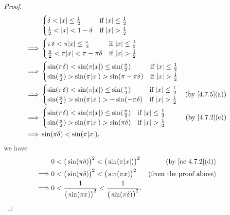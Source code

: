 \begin{proof}
\begin{align*}
             & \begin{cases}
                 \delta < \abs{x} \leq \frac{1}{2}  & \text{if } \abs{x} \leq \frac{1}{2} \\
                 \frac{1}{2} < \abs{x} < 1 - \delta & \text{if } \abs{x} > \frac{1}{2}    \\
               \end{cases}                               \\
    \implies & \begin{cases}
                 \pi \delta < \pi \abs{x} \leq \frac{\pi}{2}    & \text{if } \abs{x} \leq \frac{1}{2} \\
                 \frac{\pi}{2} < \pi \abs{x} < \pi - \pi \delta & \text{if } \abs{x} > \frac{1}{2}    \\
               \end{cases}                   \\
    \implies & \begin{cases}
                 \sin(\pi \delta) < \sin(\pi \abs{x}) \leq \sin(\frac{\pi}{2})    & \text{if } \abs{x} \leq \frac{1}{2} \\
                 \sin(\frac{\pi}{2}) > \sin(\pi \abs{x}) > \sin(\pi - \pi \delta) & \text{if } \abs{x} > \frac{1}{2}    \\
               \end{cases} \\
    \implies & \begin{cases}
                 \sin(\pi \delta) < \sin(\pi \abs{x}) \leq \sin(\frac{\pi}{2}) & \text{if } \abs{x} \leq \frac{1}{2} \\
                 \sin(\frac{\pi}{2}) > \sin(\pi \abs{x}) > -\sin(-\pi \delta)  & \text{if } \abs{x} > \frac{1}{2}    \\
               \end{cases}    & \text{(by \cref{4.7.5}(a))}    \\
    \implies & \begin{cases}
                 \sin(\pi \delta) < \sin(\pi \abs{x}) \leq \sin(\frac{\pi}{2}) & \text{if } \abs{x} \leq \frac{1}{2} \\
                 \sin(\frac{\pi}{2}) > \sin(\pi \abs{x}) > \sin(\pi \delta)    & \text{if } \abs{x} > \frac{1}{2}    \\
               \end{cases}    & \text{(by \cref{4.7.2}(c))}    \\
    \implies & \sin(\pi \delta) < \sin(\pi \abs{x}),
  \end{align*}
  we have
  \begin{align*}
             & 0 < \big(\sin(\pi \delta)\big)^2 < \big(\sin(\pi \abs{x})\big)^2                & \text{(by \cref{ac 4.7.2}(d))} \\
    \implies & 0 < \big(\sin(\pi \delta)\big)^2 < \big(\sin(\pi x)\big)^2                      & \text{(from the proof above)}  \\
    \implies & 0 < \frac{1}{\big(\sin(\pi x)\big)^2} < \frac{1}{\big(\sin(\pi \delta)\big)^2}.
  \end{align*}
\end{proof}

